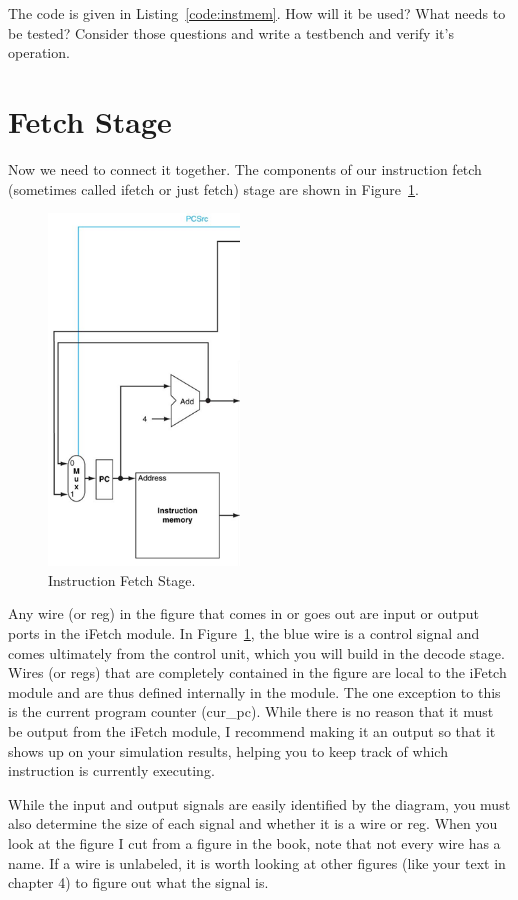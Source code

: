 The code is given in Listing~\ref{code:instmem}.  How will it be used?  What needs to be tested?  Consider those questions and write a testbench and verify it's operation.

\section{Fetch Stage}
Now we need to connect it together.  The components of our instruction fetch (sometimes called ifetch or just fetch) stage are shown in Figure~\ref{fig:fetch}.

\begin{figure}
\caption{Instruction Fetch Stage.}\label{fig:fetch}
\begin{center}
\includegraphics[width=2in]{../images/pipeline_fetch.png}
\end{center}
\end{figure}

Any wire (or reg) in the figure that comes in or goes out are input or output ports in the iFetch module.  In Figure~\ref{fig:fetch}, the blue wire is a control signal and comes ultimately from the control unit, which you will build in the decode stage.   Wires (or regs) that are completely contained in the figure are local to the iFetch module and are thus defined internally in the module.  The one exception to this is the current program counter (cur\_pc).  While there is no reason that it must be output from the iFetch module, I recommend making it an output so that it shows up on your simulation results, helping you to keep track of which instruction is currently executing.  

While the input and output signals are easily identified by the diagram, you must also determine the size of each signal and whether it is a wire or reg.  When you look at the figure I cut from a figure in the book, note that not every wire has a name.  If a wire is unlabeled, it is worth looking at other figures (like your text in chapter 4) to figure out what the signal is.  

